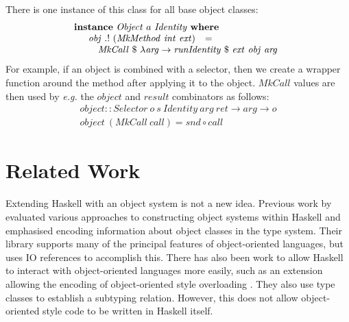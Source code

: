 \documentclass[authoryear,preprint]{sigplanconf}
\begin{document}
There is one instance of this class for all base object classes:
\begin{displaymath}
\begin{array}{l}
\mathbf{instance}~\mathit{Object}~a~\mathit{Identity}~\mathbf{where}\\
\quad \begin{array}{lcl}
\mathit{obj}~.!~(\mathit{MkMethod}~\mathit{int}~\mathit{ext}) & = & \\
\multicolumn{3}{l}{\quad \mathit{MkCall}~ \$~\lambda \mathit{arg} \to \mathit{runIdentity}~\$~\mathit{ext}~\mathit{obj}~\mathit{arg} } %
\end{array}
\end{array}
\end{displaymath}
For example, if an object is combined with a selector, then we create a wrapper function around the method after applying it to the object. $\mathit{MkCall}$ values are then used by \emph{e.g.} the $\mathit{object}$ and $\mathit{result}$ combinators as follows:
\begin{displaymath}
\begin{array}{l}
\mathit{object} :: \mathit{Selector}~o~s~\mathit{Identity}~\mathit{arg}~\mathit{ret} \to arg \to o\\
\mathit{object}~(\mathit{MkCall}~\mathit{call})  = \mathit{snd} \circ \mathit{call}
\end{array}
\end{displaymath}



\section{Related Work}
\label{sec:related}

Extending Haskell with an object system is not a new idea. Previous work by \citet{kiselyov2005haskell} evaluated various approaches to constructing object systems within Haskell and emphasised encoding information about object classes in the type system. Their library supports many of the principal features of object-oriented languages, but uses IO references to accomplish this. There has also been work to allow Haskell to interact with object-oriented languages more easily, such as an extension allowing the encoding of object-oriented style overloading \cite{shields2001object}. They also use type classes to establish a subtyping relation. However, this does not allow object-oriented style code to be written in Haskell itself.
\end{document}
